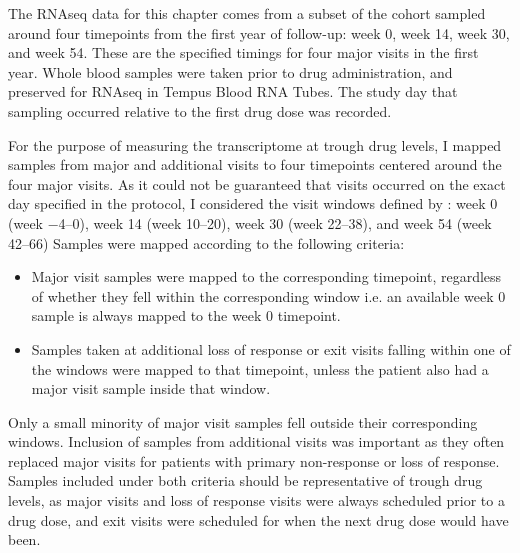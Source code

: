 \begin{outline}
%
The \gls{RNAseq} data for this chapter comes from a subset of the cohort sampled around four timepoints from the first year of follow-up: week 0, week 14, week 30, and week 54.
These are the specified timings for four major visits in the first year.
Whole blood samples were taken prior to drug administration, and preserved for \gls{RNAseq} in Tempus Blood RNA Tubes.
The study day that sampling occurred relative to the first drug dose was recorded.

For the purpose of measuring the transcriptome at trough drug levels, I mapped samples from major and additional visits to four timepoints centered around the four major visits.
As it could not be guaranteed that visits occurred on the exact day specified in the protocol, I considered the visit windows defined by \textcite{kennedy2019PredictorsAntiTNFTreatment}: week 0 (week \numrange{-4}{0}), week 14 (week \numrange{10}{20}), week 30 (week \numrange{22}{38}), and week 54 (week \numrange{42}{66})
Samples were mapped according to the following criteria:
\begin{itemize}
    \item Major visit samples were mapped to the corresponding timepoint, regardless of whether they fell within the corresponding window i.e. an available week 0 sample is always mapped to the week 0 timepoint.
    \item Samples taken at additional loss of response or exit visits falling within one of the windows were mapped to that timepoint, unless the patient also had a major visit sample inside that window.
\end{itemize}
Only a small minority of major visit samples fell outside their corresponding windows.
Inclusion of samples from additional visits was important as they often replaced major visits for patients with primary non-response or loss of response.
Samples included under both criteria should be representative of trough drug levels,
as major visits and loss of response visits were always scheduled prior to a drug dose,
and exit visits were scheduled for when the next drug dose would have been.


\end{outline}
